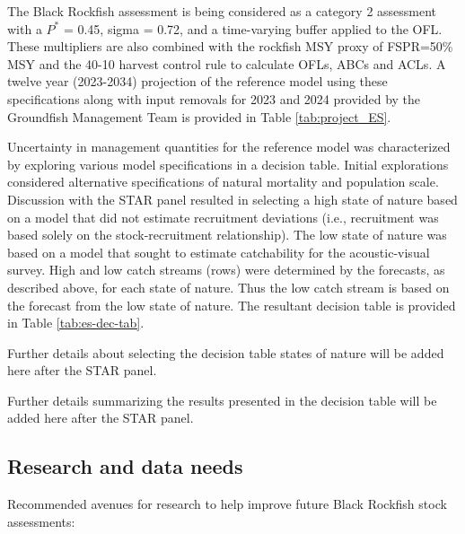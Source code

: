 \documentclass[11pt,
  english,
  letterpaper,
]{article}
\begin{document}
The Black Rockfish assessment is being considered as a category 2 assessment with a \(P^*\) = 0.45, sigma = 0.72, and a time-varying buffer applied to the OFL. These multipliers are also combined with the rockfish MSY proxy of FSPR=50\% MSY and the 40-10 harvest control rule to calculate OFLs, ABCs and ACLs. A twelve year (2023-2034) projection of the reference model using these specifications along with input removals for 2023 and 2024 provided by the Groundfish Management Team is provided in Table \ref{tab:project_ES}.

Uncertainty in management quantities for the reference model was characterized by exploring various model specifications in a decision table. Initial explorations considered alternative specifications of natural mortality and population scale. Discussion with the STAR panel resulted in selecting a high state of nature based on a model that did not estimate recruitment deviations (i.e., recruitment was based solely on the stock-recruitment relationship). The low state of nature was based on a model that sought to estimate catchability for the acoustic-visual survey. High and low catch streams (rows) were determined by the forecasts, as described above, for each state of nature. Thus the low catch stream is based on the forecast from the low state of nature. The resultant decision table is provided in Table \ref{tab:es-dec-tab}.



Further details about selecting the decision table states of nature will be added here after the STAR panel.

Further details summarizing the results presented in the decision table will be added here after the STAR panel.

\clearpage



\clearpage

\hypertarget{research-and-data-needs}{%
\subsection*{Research and data needs}\label{research-and-data-needs}}

Recommended avenues for research to help improve future Black Rockfish stock assessments:
\end{document}
